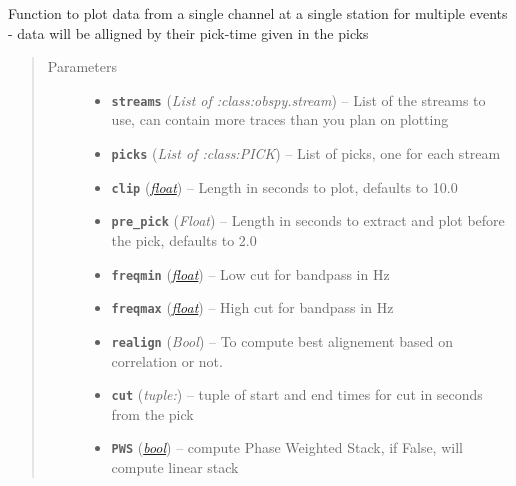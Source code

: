 \documentclass[a4paper,10pt,english]{sphinxmanual}
\begin{document}
\begin{fulllineitems}
\label{utils:EQcorrscan_plotting.multi_event_singlechan}
Function to plot data from a single channel at a single station for multiple
events - data will be alligned by their pick-time given in the picks
\begin{quote}\begin{description}
\item[{Parameters}] \leavevmode\begin{itemize}
\item {} 
\textbf{\texttt{streams}} (\emph{List of :class:obspy.stream}) -- List of the streams to use, can contain more traces than        you plan on plotting

\item {} 
\textbf{\texttt{picks}} (\emph{List of :class:PICK}) -- List of picks, one for each stream

\item {} 
\textbf{\texttt{clip}} (\href{https://docs.python.org/library/functions.html\#float}{\emph{float}}) -- Length in seconds to plot, defaults to 10.0

\item {} 
\textbf{\texttt{pre\_pick}} (\emph{Float}) -- Length in seconds to extract and plot before the pick,        defaults to 2.0

\item {} 
\textbf{\texttt{freqmin}} (\href{https://docs.python.org/library/functions.html\#float}{\emph{float}}) -- Low cut for bandpass in Hz

\item {} 
\textbf{\texttt{freqmax}} (\href{https://docs.python.org/library/functions.html\#float}{\emph{float}}) -- High cut for bandpass in Hz

\item {} 
\textbf{\texttt{realign}} (\emph{Bool}) -- To compute best alignement based on correlation or not.

\item {} 
\textbf{\texttt{cut}} (\emph{tuple:}) -- tuple of start and end times for cut in seconds from the pick

\item {} 
\textbf{\texttt{PWS}} (\href{https://docs.python.org/library/functions.html\#bool}{\emph{bool}}) -- compute Phase Weighted Stack, if False, will compute linear stack


\end{itemize}
\end{description}
\end{quote}
\end{fulllineitems}
\end{document}
